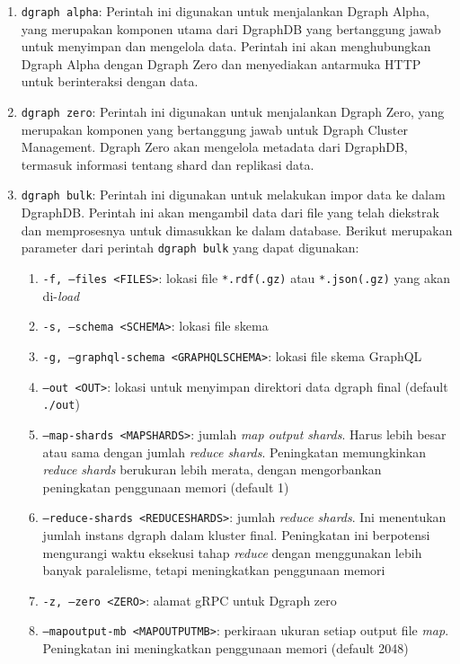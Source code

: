 \begin{enumerate}
	\item \texttt{dgraph alpha}: Perintah ini digunakan untuk menjalankan Dgraph Alpha, yang merupakan komponen utama dari DgraphDB yang bertanggung jawab untuk menyimpan dan mengelola data. Perintah ini akan menghubungkan Dgraph Alpha dengan Dgraph Zero dan menyediakan antarmuka HTTP untuk berinteraksi dengan data.
	\item \texttt{dgraph zero}: Perintah ini digunakan untuk menjalankan Dgraph Zero, yang merupakan komponen yang bertanggung jawab untuk Dgraph Cluster Management. Dgraph Zero akan mengelola metadata dari DgraphDB, termasuk informasi tentang shard dan replikasi data.
	\item \texttt{dgraph bulk}: Perintah ini digunakan untuk melakukan impor data ke dalam DgraphDB. Perintah ini akan mengambil data dari file yang telah diekstrak dan memprosesnya untuk dimasukkan ke dalam database. Berikut merupakan parameter dari perintah \texttt{dgraph bulk} yang dapat digunakan:
	      \begin{enumerate}
		      \item \texttt{-f, --files <FILES>}: lokasi file \texttt{*.rdf(.gz)} atau \texttt{*.json(.gz)} yang akan di-\textit{load}
		      \item \texttt{-s, --schema <SCHEMA>}: lokasi file skema
		      \item \texttt{-g, --graphql-schema <GRAPHQL\textunderscore SCHEMA>}: lokasi file skema GraphQL
		      \item \texttt{--out <OUT>}: lokasi untuk menyimpan direktori data dgraph final (default \texttt{./out})
		      \item \texttt{--map-shards <MAP\textunderscore SHARDS>}: jumlah \textit{map output shards}. Harus lebih besar atau sama dengan jumlah \textit{reduce shards}. Peningkatan memungkinkan \textit{reduce shards} berukuran lebih merata, dengan mengorbankan peningkatan penggunaan memori (default 1)
		      \item \texttt{--reduce-shards <REDUCE\textunderscore SHARDS>}: jumlah \textit{reduce shards}. Ini menentukan jumlah instans dgraph dalam kluster final. Peningkatan ini berpotensi mengurangi waktu eksekusi tahap \textit{reduce} dengan menggunakan lebih banyak paralelisme, tetapi meningkatkan penggunaan memori
		      \item \texttt{-z, --zero <ZERO>}: alamat gRPC untuk Dgraph zero
		      \item \texttt{--mapoutput-mb <MAPOUTPUT\textunderscore MB>}: perkiraan ukuran setiap output file \textit{map}. Peningkatan ini meningkatkan penggunaan memori (default 2048)

\end{enumerate}
\end{enumerate}
